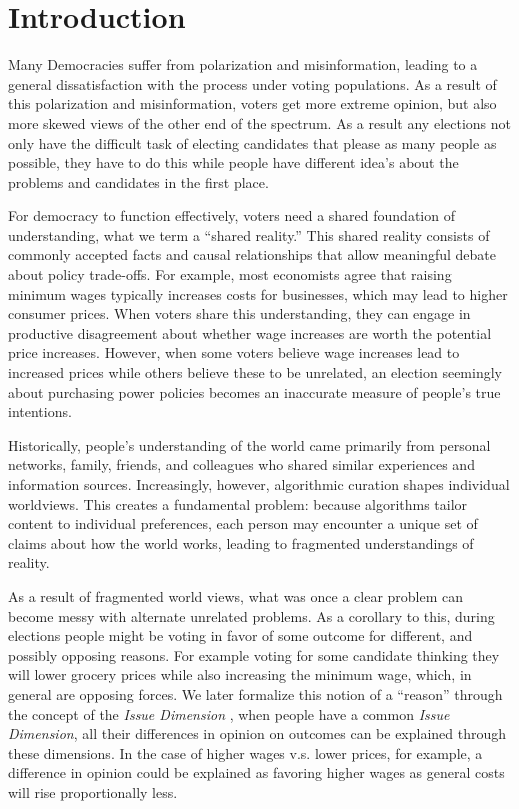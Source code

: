 \newpage
\chapter{Introduction}
\label{Introduction}

Many Democracies suffer from polarization and misinformation, leading to a
general dissatisfaction with the process under voting populations. As a result
of this polarization and misinformation, voters get more extreme opinion, but
also more skewed views of the other end of the spectrum. As a result any
elections not only have the difficult task of electing candidates that please
as many people as possible, they have to do this while people have different
idea's about the problems and candidates in the first place.

For democracy to function effectively, voters need a shared foundation of
understanding, what we term a ``shared reality.'' This shared reality consists
of commonly accepted facts and causal relationships that allow meaningful
debate about policy trade-offs. For example, most economists agree that raising
minimum wages typically increases costs for businesses, which may lead to
higher consumer prices. When voters share this understanding, they can engage
in productive disagreement about whether wage increases are worth the potential
price increases. However, when some voters believe wage increases lead to
increased prices while others believe these to be unrelated, an election
seemingly about purchasing power policies becomes an inaccurate measure of
people's true intentions.

Historically, people's understanding of the world came primarily from personal
networks, family, friends, and colleagues who shared similar experiences and
information sources. Increasingly, however, algorithmic curation shapes
individual worldviews. This creates a fundamental problem: because algorithms
tailor content to individual preferences, each person may encounter a unique
set of claims about how the world works, leading to fragmented understandings
of reality.

As a result of fragmented world views, what was once a clear problem can become
messy with alternate unrelated problems. As a corollary to this, during
elections people might be voting in favor of some outcome for different, and
possibly opposing reasons. For example voting for some candidate thinking they
will lower grocery prices while also increasing the minimum wage, which, in
general are opposing forces. We later formalize this notion of a ``reason''
through the concept of the \textit{Issue Dimension}
\cite{listTwoConceptsAgreement2002}, when people have a common \textit{Issue
	Dimension}, all their differences in opinion on outcomes can be explained
through these dimensions. In the case of higher wages v.s. lower prices, for
example, a difference in opinion could be explained as favoring higher wages
as general costs will rise proportionally less.

